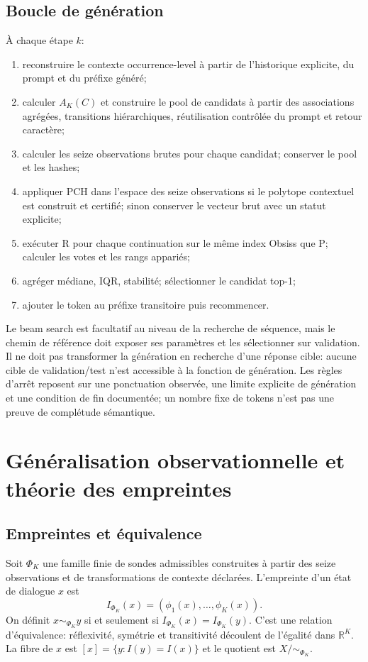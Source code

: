 \documentclass[11pt,a4paper]{report}
\newcommand{\R}{\mathbb R}
\begin{document}
\section{Boucle de génération}
À chaque étape $k$:
\begin{enumerate}
\item reconstruire le contexte occurrence-level à partir de l'historique explicite, du prompt et du préfixe généré;
\item calculer $A_K(C)$ et construire le pool de candidats à partir des associations agrégées, transitions hiérarchiques, réutilisation contrôlée du prompt et retour caractère;
\item calculer les seize observations brutes pour chaque candidat; conserver le pool et les hashes;
\item appliquer PCH dans l'espace des seize observations si le polytope contextuel est construit et certifié; sinon conserver le vecteur brut avec un statut explicite;
\item exécuter R pour chaque continuation sur le même index Obsiss que P; calculer les votes et les rangs appariés;
\item agréger médiane, IQR, stabilité; sélectionner le candidat top-1;
\item ajouter le token au préfixe transitoire puis recommencer.
\end{enumerate}

Le beam search est facultatif au niveau de la recherche de séquence, mais le chemin de référence doit exposer ses paramètres et les sélectionner sur validation. Il ne doit pas transformer la génération en recherche d'une réponse cible: aucune cible de validation/test n'est accessible à la fonction de génération. Les règles d'arrêt reposent sur une ponctuation observée, une limite explicite de génération et une condition de fin documentée; un nombre fixe de tokens n'est pas une preuve de complétude sémantique.

\chapter{Généralisation observationnelle et théorie des empreintes}
\section{Empreintes et équivalence}
Soit $\Phi_K$ une famille finie de sondes admissibles construites à partir des seize observations et de transformations de contexte déclarées. L'empreinte d'un état de dialogue $x$ est
\[
 I_{\Phi_K}(x)=(\phi_1(x),\ldots,\phi_K(x)).
\]
On définit $x\sim_{\Phi_K}y$ si et seulement si $I_{\Phi_K}(x)=I_{\Phi_K}(y)$. C'est une relation d'équivalence: réflexivité, symétrie et transitivité découlent de l'égalité dans $\R^K$. La fibre de $x$ est $[x]=\{y:I(y)=I(x)\}$ et le quotient est $X/\sim_{\Phi_K}$.
\end{document}
